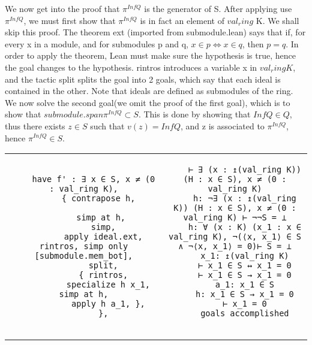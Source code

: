 \documentclass[10pt, a4paper]{article}
\begin{document}
We now get into the proof that $\pi^{Inf Q}$ is the generator of S. After applying use $\pi^{Inf Q}$, we must first show that $\pi^{Inf Q}$ is in fact an element of $val_ring$ K. We shall skip this proof. The theorem ext (imported from submodule.lean) says that if, for every x in a module, and for submodules p and q, $x \in p \iff x \in q$, then $p = q$. In order to apply the theorem, Lean must make sure the hypothesis is true, hence the goal changes to the hypothesis. rintros introduces a variable x in $val_ring K$, and the tactic split splits the goal into 2 goals, which say that each ideal is contained in the other. Note that ideals are defined as submodules of the ring. \\

We now solve the second goal(we omit the proof of the first goal), which is to show that $submodule.span {\pi^{Inf Q}} \subset S$. This is done by showing that $Inf Q \in Q$, thus there exists $z \in S$ such that $v(z) = Inf Q$, and z is associated to $\pi^{Inf Q}$, hence $\pi^{Inf Q} \in S$. \\

\begin{adjustbox}
\begin{tabular}{c|c}
    \begin{lstlisting}
    have f' : ∃ x ∈ S, x ≠ (0 : val_ring K),
      { contrapose h,
      
        simp at h, 
        simp,
        apply ideal.ext, rintros, simp only [submodule.mem_bot],
        split,
        { rintros,
          specialize h x_1, simp at h,
          apply h a_1, },
        },
    \end{lstlisting} &
    \begin{lstlisting}
    ⊢ ∃ (x : ↥(val_ring K)) (H : x ∈ S), x ≠ (0 : val_ring K)
    h: ¬∃ (x : ↥(val_ring K)) (H : x ∈ S), x ≠ (0 : val_ring K) ⊢ ¬¬S = ⊥
    h: ∀ (x : K) (x_1 : x ∈ val_ring K), ¬(⟨x, x_1⟩ ∈ S ∧ ¬⟨x, x_1⟩ = 0)⊢ S = ⊥
    x_1: ↥(val_ring K)
    ⊢ x_1 ∈ S ↔ x_1 = 0
    ⊢ x_1 ∈ S → x_1 = 0
    a_1: x_1 ∈ S
    h: x_1 ∈ S → x_1 = 0
    ⊢ x_1 = 0
    goals accomplished
    
    \end{lstlisting}
\end{tabular}
\end{adjustbox}
\end{document}
